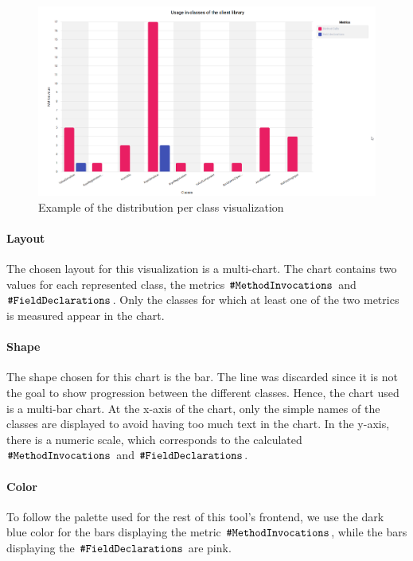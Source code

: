 \begin{figure}[ht]
\begin{center}
\includegraphics[width=\textwidth]{figures/per-class-visualization.png}
\caption{Example of the distribution per class visualization}
\label{fig:per-class-visualization}
\end{center}
\end{figure}

\paragraph{Layout}
The chosen layout for this visualization is a multi-chart. The chart contains two values for each represented class, the metrics \(\verb|#MethodInvocations|\) and \(\verb|#FieldDeclarations|\).
Only the classes for which at least one of the two metrics is measured appear in the chart.

\paragraph{Shape}
The shape chosen for this chart is the bar. The line was discarded since it is not the goal to show progression between the different classes. Hence, the chart used is a multi-bar chart.
At the x-axis of the chart, only the simple names of the classes are displayed to avoid having too much text in the chart. In the y-axis, there is a numeric scale, which corresponds to the calculated \(\verb|#MethodInvocations|\) and \(\verb|#FieldDeclarations|\).

\paragraph{Color}
To follow the palette used for the rest of this tool's frontend, we use the dark blue color for the bars displaying the metric \(\verb|#MethodInvocations|\), while the bars displaying the \(\verb|#FieldDeclarations|\) are pink.

